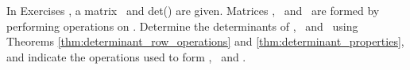 {\noin In Exercises }
{, a matrix \ttm\ and det(\ttm) are given. Matrices \tta, \ttb\ and \ttc\ are formed by performing operations on \ttm. Determine the determinants of \tta, \ttb\ and \ttc\ using Theorems 
\ref{thm:determinant_row_operations} and \ref{thm:determinant_properties},
  and indicate the operations used to form \tta, \ttb\ and \ttc.}
